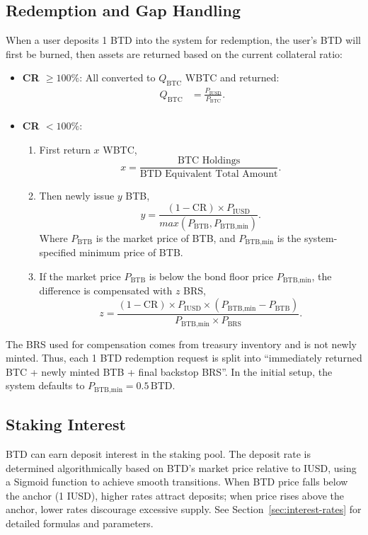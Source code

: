 \documentclass{article}
\begin{document}
\subsection{Redemption and Gap Handling}
When a user deposits 1 BTD into the system for redemption, the user's BTD will first be burned, then assets are returned based on the current collateral ratio:
\begin{itemize}
  \item \textbf{CR $\geq 100\%$}: All converted to $Q_{\text{BTC}}$ WBTC and returned:
\begin{align}
Q_{\text{BTC}} &= \frac{ P_{\text{IUSD}}}{P_{\text{BTC}}}. \\
\end{align}
  \item \textbf{CR $< 100\%$}:
    \begin{enumerate}
      \item First return $x$ WBTC,
      \begin{equation}
      x = \frac{\text{BTC Holdings}}{\text{BTD Equivalent Total Amount}}.
      \end{equation}
      \item Then newly issue $y$ BTB,
      \begin{equation}
      y = \frac{(1-\text{CR}) \times P_{\text{IUSD}}}{max(P_{\text{BTB}},P_{\text{BTB,min}})}.
      \end{equation}
Where $P_{\text{BTB}}$ is the market price of BTB, and $P_{\text{BTB,min}}$ is the system-specified minimum price of BTB.
      \item If the market price $P_{\text{BTB}}$ is below the bond floor price $P_{\text{BTB,min}}$, the difference is compensated with $z$ BRS,
      \begin{equation}
      z = \frac{(1-\text{CR}) \times P_{\text{IUSD}}\times (P_{\text{BTB,min}}-P_{\text{BTB}})}{P_{\text{BTB,min}}\times P_{\text{BRS}}}.
      \end{equation}
    \end{enumerate}
\end{itemize}
The BRS used for compensation comes from treasury inventory and is not newly minted. Thus, each 1 BTD redemption request is split into ``immediately returned BTC + newly minted BTB + final backstop BRS''.
In the initial setup, the system defaults to $P_{\text{BTB,min}} = 0.5\,\text{BTD}$.

\subsection{Staking Interest}
BTD can earn deposit interest in the staking pool. The deposit rate is determined algorithmically based on BTD's market price relative to IUSD, using a Sigmoid function to achieve smooth transitions. When BTD price falls below the anchor (1 IUSD), higher rates attract deposits; when price rises above the anchor, lower rates discourage excessive supply. See Section~\ref{sec:interest-rates} for detailed formulas and parameters.
\end{document}
